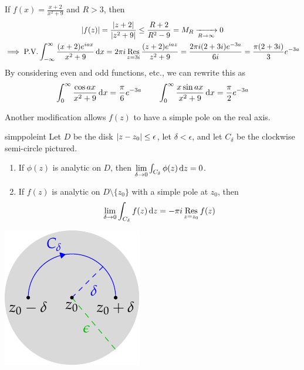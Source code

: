 \begin{example}{}{}
	If $f(x)=\frac{x+2}{x^2+9}$ and $R>3$, then
	\begin{gather*}
		\left| f(z)\right|=\frac{\left| z+2\right|}{\left| z^2+9\right|}
		\le\frac{R+2}{R^2-9}
		=M_R\xrightarrow[R\to\infty]{}0\\
		\implies \text{P.V.}\int_{-\infty}^\infty\frac{(x+2)e^{i ax}}{x^2+9}\,{\mathrm{d} x}
		=2\pi i\operatorname*{Res}_{z=3i}\frac{(z+2)e^{iaz}}{z^2+9}
		=\frac{2\pi i(2+3i)e^{-3a}}{6i} 
		=\frac{\pi(2+3i)}3e^{-3a}
	\end{gather*}
	By considering even and odd functions, etc., we can rewrite this as
	\[
		\int_0^\infty\frac{\cos ax}{x^2+9}\,{\mathrm{d} x} 
		=\frac{\pi}{6}e^{-3a}
		\qquad \int_0^\infty\frac{x\sin ax}{x^2+9}\,{\mathrm{d} x} 
		=\frac{\pi}{2}e^{-3a}
	\]
\end{example}


\goodbreak



Another modification allows $f(z)$ to have a simple pole on the real axis.

\begin{lemm}[lower separated=false, sidebyside, sidebyside align=top seam, sidebyside gap=0pt, righthand width=0.3\linewidth]{}{simppoleint}
	Let $D$ be the disk $\left| z-z_0\right|\le\epsilon$, let $\delta<\epsilon$, and let $C_\delta$ be the clockwise semi-circle pictured.
	\begin{enumerate}
	  \item If $\phi(z)$ is analytic on $D$, then $\lim\limits_{\delta\to 0}\int_{C_\delta}\phi(z)\,{\mathrm{d} z}=0$.
	  \item If $f(z)$ is analytic on $D\setminus\{z_0\}$ with a simple pole at $z_0$, then
	  \[
	  	\lim_{\delta\to 0}\int_{C_\delta}f(z)\,{\mathrm{d} z}=-\pi i\operatorname*{Res}_{z=z_0}f(z)
	  \] 
	\end{enumerate}
	\tcblower
	\flushright\includegraphics[scale=0.95]{integral5}
\end{lemm}

